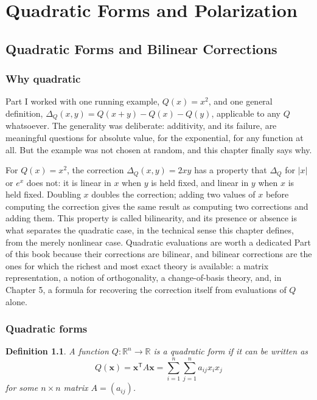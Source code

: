 \documentclass[11pt]{book}
\newtheorem{definition}[theorem]{Definition}
\begin{document}
\part{Quadratic Forms and Polarization}

\chapter{Quadratic Forms and Bilinear Corrections}

\section{Why quadratic}

Part I worked with one running example, $Q(x)=x^2$, and one general definition, $\Delta_Q(x,y)=Q(x+y)-Q(x)-Q(y)$, applicable to any $Q$ whatsoever. The generality was deliberate: additivity, and its failure, are meaningful questions for absolute value, for the exponential, for any function at all. But the example was not chosen at random, and this chapter finally says why.

For $Q(x)=x^2$, the correction $\Delta_Q(x,y)=2xy$ has a property that $\Delta_Q$ for $|x|$ or $e^x$ does not: it is linear in $x$ when $y$ is held fixed, and linear in $y$ when $x$ is held fixed. Doubling $x$ doubles the correction; adding two values of $x$ before computing the correction gives the same result as computing two corrections and adding them. This property is called bilinearity, and its presence or absence is what separates the quadratic case, in the technical sense this chapter defines, from the merely nonlinear case. Quadratic evaluations are worth a dedicated Part of this book because their corrections are bilinear, and bilinear corrections are the ones for which the richest and most exact theory is available: a matrix representation, a notion of orthogonality, a change-of-basis theory, and, in Chapter 5, a formula for recovering the correction itself from evaluations of $Q$ alone.

\section{Quadratic forms}

\begin{definition}
A function $Q:\mathbb{R}^n \to \mathbb{R}$ is a \emph{quadratic form} if it can be written as
\[
Q(\mathbf{x}) = \mathbf{x}^{\mathsf T}A\mathbf{x} = \sum_{i=1}^n\sum_{j=1}^n a_{ij}x_ix_j
\]
for some $n\times n$ matrix $A=(a_{ij})$.
\end{definition}
\end{document}
